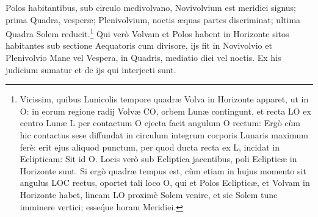 \documentclass[a4paper, 11pt, oneside, polutonikogreek, german]{article}
\begin{document}
Polos habitantibus, sub circulo medivolvano, Novivolvium est meridiei signus; prima Quadra, vesperæ; Plenivolvium, noctis æquas partes discriminat; ultima Quadra Solem reducit.\footnote{Vicissim, quibus Lunicolis tempore quadræ Volva in Horizonte apparet, ut in O: in eorum regione radij Volvæ CO, orbem Lunæ contingunt, et recta LO ex centro Lunæ L per contactum O ejecta facit angulum O rectum: Ergò cùm hic contactus sese diffundat in circulum integrum corporis Lunaris maximum ferè: erit ejus aliquod punctum, per quod ducta recta ex L, incidat in Eclipticam: Sit id O. Locis verò sub Ecliptica jacentibus, poli Eclipticæ in Horizonte sunt. Si ergò quadræ tempus est, cùm etiam in hujus momento sit angulus LOC rectus, oportet tali loco O, qui et Polos Eclipticæ, et Volvam in Horizonte habet, lineam LO proximè Solem venire, et sic Solem tunc imminere vertici; esse\'que horam Meridiei.} Qui verò Volvam et Polos habent in Horizonte sitos habitantes sub sectione Aequatoris cum divisore, ijs fit in Novivolvio et Plenivolvio Mane vel Vespera, in Quadris, mediatio diei vel noctis. Ex his judicium sumatur et de ijs qui interjecti sunt.
\end{document}

